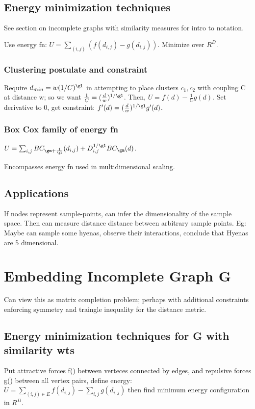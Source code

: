 \documentclass[oneside, article]{memoir}
\begin{document}
\section{Energy minimization techniques}
See section on incomplete graphs with similarity measures for intro to notation.

Use energy fn: $U = \sum_{(i,j)} (f(d_{i,j}) - g(d_{i,j}))$. Minimize over $R^{D}$.

\subsection{Clustering postulate and constraint}
Require $d_{min} = w(1/C)^{\gl}$ in attempting to place clusters $c_{1}, c_{2}$ with coupling C at distance w; so we want $\frac{1}{C} = (\frac{d}{w})^{1/\gl}$. Then, $U = f(d) - \frac{1}{C}g(d)$. Set derivative to 0, get constraint: $f'(d) = (\frac{d}{w})^{1/\gl}g'(d)$.

\subsection{Box Cox family of energy fn}
$U = \sum_{i,j} BC_{\gm + \frac{1}{\gl}}(d_{i,j}) + D_{i,j}^{1/\gl}BC_{\gm}(d)$.

Encompasses energy fn used in multidimensional scaling.

\section{Applications}
If nodes represent sample-points, can infer the dimensionality of the sample space. Then can measure distance distance between arbitrary sample points. Eg: Maybe can sample some hyenas, observe their interactions, conclude that Hyenas are 5 dimensional.

\chapter{Embedding Incomplete Graph G}
Can view this as matrix completion problem; perhaps with additional constraints enforcing symmetry and traingle inequality for the distance metric.

\section{Energy minimization techniques for G with similarity wts}
Put attractive forces f() between verteces connected by edges, and repulsive forces g() between all vertex pairs, define energy: $U = \sum_{(i,j) \in E} f(d_{i,j}) - \sum_{i,j}g(d_{i,j})$ then find minimum energy configuration in $R^{D}$.
\end{document}
